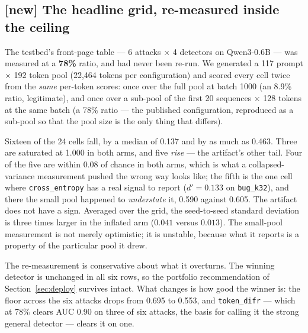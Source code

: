 \documentclass[11pt]{article}
\newcommand{\td}{\texttt{token\_difr}}
\newcommand{\ce}{\texttt{cross\_entropy}}
\begin{document}
\subsection{[new] The headline grid, re-measured inside the ceiling}
\label{sec:headline}

The testbed's front-page table --- 6 attacks $\times$ 4 detectors on Qwen3-0.6B ---
was measured at a \textbf{78\%} ratio, and had never been re-run. We generated a
117 prompt $\times$ 192 token pool (22{,}464 tokens per configuration) and scored
every cell twice from the \emph{same} per-token scores: once over the full pool at
batch 1000 (an 8.9\% ratio, legitimate), and once over a sub-pool of the first 20
sequences $\times$ 128 tokens at the same batch (a 78\% ratio --- the published
configuration, reproduced as a sub-pool so that the pool size is the only thing that
differs).

\begin{table}[h]
\centering\small

\caption{[new] The testbed's headline grid, scored twice from the \emph{same}
per-token scores: at the published 78\% batch/pool ratio and at a legitimate
8.9\% ratio. Qwen3-0.6B, 22{,}464-token pool, batch 1000, mean over 5 protocol
seeds (standard deviations in the text). \textbf{Bold} marks the detector a
portfolio would pick for that attack --- the same one in both arms, in every row.
Figure~\ref{fig:ratio}A plots the same 24 cells.}
\label{tab:headline}
\end{table}

Sixteen of the 24 cells fall, by a median of 0.137 and by as much as 0.463. Three
are saturated at 1.000 in both arms, and five \emph{rise} --- the artifact's other
tail. Four of the five are within 0.08 of chance in both arms, which is what a
collapsed-variance measurement pushed the wrong way looks like; the fifth is the
one cell where \ce{} has a real signal to report ($d' = 0.133$ on
\texttt{bug\_k32}), and there the small pool happened to \emph{understate} it,
0.590 against 0.605. The artifact does not have a sign.
Averaged over the grid, the seed-to-seed standard deviation is three times larger
in the inflated arm ($0.041$ versus $0.013$). The small-pool measurement is not
merely optimistic; it is unstable, because what it reports is a property of the
particular pool it drew.

The re-measurement is conservative about what it overturns. The winning detector
is unchanged in all six rows, so the portfolio recommendation of
Section~\ref{sec:deploy} survives intact. What changes is how good the winner is:
the floor across the six attacks drops from 0.695 to 0.553, and \td{} --- which at
78\% clears AUC 0.90 on three of six attacks, the basis for calling it the strong
general detector --- clears it on one.
\end{document}
